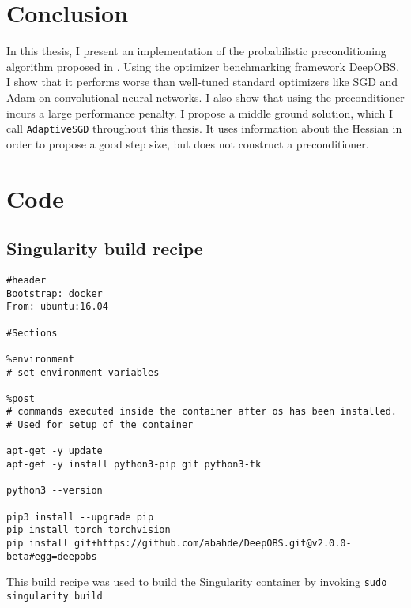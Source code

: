 \documentclass[twoside,12pt,a4paper]{report}
\begin{document}
\chapter{Conclusion}
In this thesis, I present an implementation of the probabilistic preconditioning algorithm proposed in \cite{roos2019active}. Using the optimizer benchmarking framework DeepOBS,  I show that it performs worse than well-tuned standard optimizers like SGD and Adam on convolutional neural networks. I also show that using the preconditioner incurs a large performance penalty. I propose a middle ground solution, which I call \verb|AdaptiveSGD| throughout this thesis. It uses information about the Hessian in order to propose a good step size, but does not construct a preconditioner.


\appendix %
\chapter{Code}
\section{Singularity build recipe}
\begin{verbatim}
#header
Bootstrap: docker
From: ubuntu:16.04

#Sections

%environment
# set environment variables

%post
# commands executed inside the container after os has been installed.
# Used for setup of the container

apt-get -y update
apt-get -y install python3-pip git python3-tk

python3 --version

pip3 install --upgrade pip
pip install torch torchvision
pip install git+https://github.com/abahde/DeepOBS.git@v2.0.0-beta#egg=deepobs

\end{verbatim}
This build recipe was used to build the Singularity container by invoking \verb|sudo singularity build|
\end{document}
